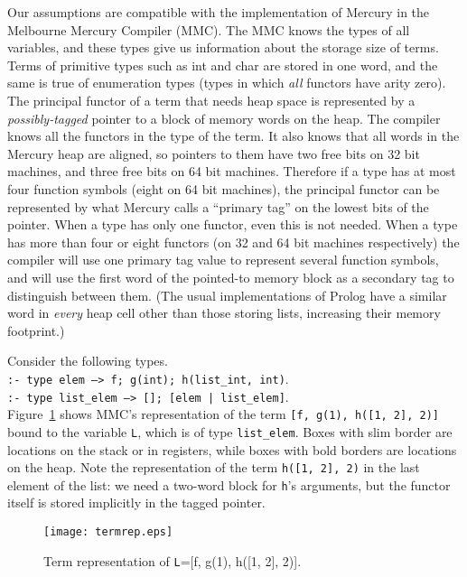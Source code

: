 \documentclass{tlp}
\newcommand{\code}[1]{{\tt#1}}
\begin{document}
Our assumptions are compatible with the implementation of Mercury
in the Melbourne Mercury Compiler (MMC).
The MMC knows the types of all variables,
and these types give us information about the storage size of terms.
Terms of primitive types such as int and char are stored in one word,
and the same is true of enumeration types
(types in which \emph{all} functors have arity zero).
The principal functor of a term that needs heap space is represented
by a \emph{possibly-tagged} pointer to a block of memory words on the heap.
The compiler knows all the functors in the type of the term.
It also knows that all words in the Mercury heap are aligned,
so pointers to them have two free bits on 32 bit machines,
and three free bits on 64 bit machines.
Therefore if a type has at most four function symbols
(eight on 64 bit machines),
the principal functor can be represented
by what Mercury calls a ``primary tag'' on the lowest bits of the pointer.
When a type has only one functor, even this is not needed.
When a type has more than four or eight functors
(on 32 and 64 bit machines respectively)
the compiler will use one primary tag value
to represent several function symbols,
and will use the first word of the pointed-to memory block
as a secondary tag to distinguish between them.
(The usual implementations of Prolog have a similar word
in \emph{every} heap cell other than those storing lists,
increasing their memory footprint.)

\begin{example} Consider the following types.\\
    \code{:- type elem ---> f; g(int); h(list\_int, int)}.\\
    \code{:- type list\_elem ---> []; [elem | list\_elem]}.\\
Figure~\ref{fig:termrep} shows MMC's representation
of the term \code{[f, g(1), h([1, 2], 2)]} bound to the variable \code{L},
which is of type \code{list\_elem}.
Boxes with slim border are locations on the stack or in registers,
while boxes with bold borders are locations on the heap.
Note the representation of the term \code{h([1, 2], 2)}
in the last element of the list:
we need a two-word block for \code{h}'s arguments,
but the functor itself is stored implicitly in the tagged pointer.
\hfill 
\label{example:termrep}
\end{example}
\begin{figure}[htp]
\centering
\texttt{[image: termrep.eps]}
\caption{Term representation of \code{L}=[f, g(1), h([1, 2], 2)].}
\label{fig:termrep}
\end{figure}
\end{document}
